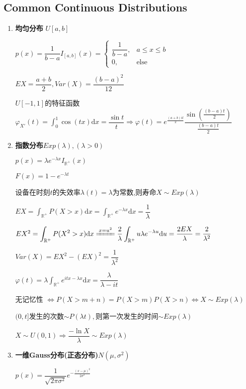 \subsection{Common Continuous Distributions}
\begin{enumerate}
	\item \textbf{均匀分布} $U[a,b]$

	$p(x) = \dfrac{1}{b-a}I_{[a,b]}(x) = \left \{ \begin{matrix}\dfrac{1}{b-a}, & a\le x \le b \\0, &  \text{else}\end{matrix}\right.$

		$EX = \dfrac{a+b}{2}, Var(X) = \dfrac{(b-a)^2}{12}$

        $ U[-1,1]$的特征函数$\varphi_{X'}(t)=\int_{0}^1{\cos(tx)\mathrm{d}x} = \dfrac{\sin t}{t}\Rightarrow \varphi(t) =
      e^{\frac{(a+b)it}{2}}\dfrac{\sin(\frac{(b-a)t}{2})}{\frac{(b-a)t}{2}}$

	\item \textbf{指数分布}$Exp(\lambda),(\lambda > 0)$

		$p(x) = \lambda e^{-\lambda x}I_{\mathbb{R^+}}(x)$

		$F(x) = 1-e^{-\lambda t}$

		设备在时刻$t$的失效率$\lambda(t) = \lambda$为常数,则寿命$X\sim Exp(\lambda)$

		$EX = \int_{\mathbb{R^+}}{P(X>x)\mathrm{d}x} = \int_{\mathbb{R^+}}{e^{-\lambda x}\mathrm{d}x} = \dfrac{1}{\lambda}$

		$ EX^2 = \int_{\mathbb{R^+}}{P(X^2 > x)\mathrm{d}x} \xlongequal{x = u^2} \dfrac{2}{\lambda}\int_{\mathbb{R^+}}{u\lambda e^{-\lambda u}\mathrm{d}u}
		= \dfrac{2EX}{\lambda} = \dfrac{2}{\lambda^2}$

		$Var(X) = EX^2 - (EX)^2 = \dfrac{1}{\lambda^2}$

        $ \varphi(t) = \lambda\int_{\mathbb{R}^+}e^{itx-\lambda x}\mathrm{d}x=\dfrac{\lambda}{\lambda-it}$

		无记忆性 $\Leftrightarrow P(X>m+n) = P(X>m)P(X>n)\Leftrightarrow X\sim Exp(\lambda)$

	$(0,t]$发生的次数$\sim P(\lambda t),$则第一次发生的时间$\sim Exp(\lambda)$

    $ X\sim U(0,1)\Rightarrow  \dfrac{-\ln X}{\lambda}\sim Exp(\lambda)$


\item \textbf{一维Gauss分布(正态分布)}$N(\mu, \sigma^2)$

	$p(x) = \dfrac{1}{\sqrt{2\pi \sigma^2}}e^{-\frac{(x-\mu)^2}{2\sigma^2}}$


\end{enumerate}
